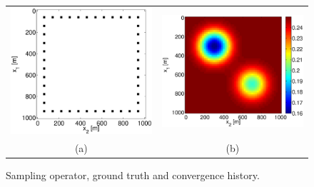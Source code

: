 \documentclass{iopart}
\begin{document}
\begin{figure}
\centering
\begin{tabular}{cc}
\includegraphics[scale=.4]{./figs/2D_exp1_a}&
\includegraphics[scale=.4]{./figs/2D_exp1_b}\\
{\small (a)}&{\small (b)}\\
\end{tabular}
\caption{Sampling operator, ground truth and convergence history.}
\label{fig:2D_exp1a}
\end{figure}
\end{document}
